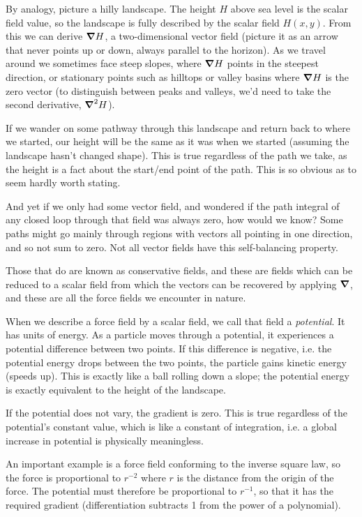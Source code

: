 By analogy, picture a hilly landscape. The height $H$ above sea level is the scalar field value, so the landscape is fully described by the scalar field $H(x, y)$. From this we can derive $\grad H$, a two-dimensional vector field (picture it as an arrow that never points up or down, always parallel to the horizon). As we travel around we sometimes face steep slopes, where $\grad H$ points in the steepest direction, or stationary points such as hilltops or valley basins where $\grad H$ is the zero vector (to distinguish between peaks and valleys, we'd need to take the second derivative, $\grad^2H$).

If we wander on some pathway through this landscape and return back to where we started, our height will be the same as it was when we started (assuming the landscape hasn't changed shape). This is true regardless of the path we take, as the height is a fact about the start/end point of the path. This is so obvious as to seem hardly worth stating.

And yet if we only had some vector field, and wondered if the path integral of any closed loop through that field was always zero, how would we know? Some paths might go mainly through regions with vectors all pointing in one direction, and so not sum to zero. Not all vector fields have this self-balancing property.

Those that do are known as conservative fields, and these are fields which can be reduced to a scalar field from which the vectors can be recovered by applying $\grad$, and these are all the force fields we encounter in nature.

When we describe a force field by a scalar field, we call that field a \textit{potential}. It has units of energy. As a particle moves through a potential, it experiences a potential difference between two points. If this difference is negative, i.e. the potential energy drops between the two points, the particle gains kinetic energy (speeds up). This is exactly like a ball rolling down a slope; the potential energy is exactly equivalent to the height of the landscape.

If the potential does not vary, the gradient is zero. This is true regardless of the potential's constant value, which is like a constant of integration, i.e. a global increase in potential is physically meaningless.

An important example is a force field conforming to the inverse square law, so the force is proportional to $r^{-2}$ where $r$ is the distance from the origin of the force. The potential must therefore be proportional to $r^{-1}$, so that it has the required gradient (differentiation subtracts 1 from the power of a polynomial).
